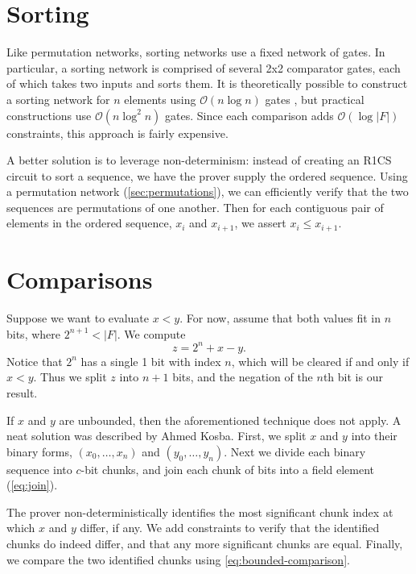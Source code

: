 \documentclass{article}
\begin{document}
\section{Sorting}

Like permutation networks, sorting networks use a fixed network of gates. In particular, a sorting network is comprised of several 2x2 comparator gates, each of which takes two inputs and sorts them. It is theoretically possible to construct a sorting network for $n$ elements using $\mathcal{O}(n \log n)$ gates \cite{ajtai19830}, but practical constructions use $\mathcal{O}(n \log^2 n)$ gates. Since each comparison adds $\mathcal{O}(\log |F|)$ constraints, this approach is fairly expensive.

A better solution is to leverage non-determinism: instead of creating an R1CS circuit to sort a sequence, we have the prover supply the ordered sequence. Using a permutation network (\autoref{sec:permutations}), we can efficiently verify that the two sequences are permutations of one another. Then for each contiguous pair of elements in the ordered sequence, $x_i$ and $x_{i + 1}$, we assert $x_i \le x_{i + 1}$.


\section{Comparisons} \label{sec:comparisons}

Suppose we want to evaluate $x < y$. For now, assume that both values fit in $n$ bits, where $2^{n + 1} < |F|$. We compute
\begin{equation} \label{eq:bounded-comparison}
  z = 2^n + x - y.
\end{equation}
Notice that $2^n$ has a single 1 bit with index $n$, which will be cleared if and only if $x < y$. Thus we split $z$ into $n + 1$ bits, and the negation of the $n$th bit is our result.

If $x$ and $y$ are unbounded, then the aforementioned technique does not apply. A neat solution was described by Ahmed Kosba. First, we split $x$ and $y$ into their binary forms, $(x_0, \dots, x_n)$ and $(y_0, \dots, y_n)$. Next we divide each binary sequence into $c$-bit chunks, and join each chunk of bits into a field element (\autoref{eq:join}).

The prover non-deterministically identifies the most significant chunk index at which $x$ and $y$ differ, if any. We add constraints to verify that the identified chunks do indeed differ, and that any more significant chunks are equal. Finally, we compare the two identified chunks using \autoref{eq:bounded-comparison}.
\end{document}
